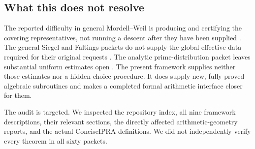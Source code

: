 \subsection{What this does not resolve}

The reported difficulty in general Mordell--Weil is producing and
certifying the covering representatives, not running a descent after
they have been supplied \cite{MordellWeil}. The general Siegel and
Faltings packets do not supply the global effective data required for
their original requests \cite{Siegel,Faltings}. The analytic
prime-distribution packet leaves substantial uniform estimates open
\cite{PrimeDistribution}. The present framework supplies neither those
estimates nor a hidden choice procedure. It does supply new, fully
proved algebraic subroutines and makes a completed formal arithmetic
interface closer for them.

The audit is targeted. We inspected the repository index, all nine
framework descriptions, their relevant sections, the directly affected
arithmetic-geometry reports, and the actual ConciseIPRA definitions.
We did not independently verify every theorem in all sixty packets.
